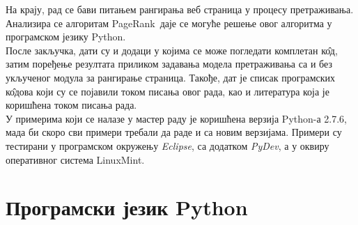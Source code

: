 \documentclass[11pt, serbianc, english, titlepage]{article}
\begin{document}
         На крају, рад се бави питањем рангирања веб страница у процесу претраживања. Анализира се алгоритам PageRank\texttrademark\ даје се могуће решење овог алгоритма у програмском језику Python.\\
         После закључка, дати су и додаци у којима се може погледати комплетан к\^{о}д, затим поређење резултата приликом задавања модела претраживања са и без укљученог модула за рангирање страница. Такође, дат је списак програмских к\^{о}дова који су се појавили током писања овог рада, као и литература која је коришћена током писања рада.\\
         У примерима који се налазе у мастер раду је коришћена верзија Python-а 2.7.6, мада би скоро сви примери требали да раде и са новим верзијама. Примери су тестирани у програмском окружењу \emph{Eclipse}, са додатком \emph{PyDev}, а у оквиру оперативног система LinuxMint.  
          
\pagebreak
\section{Програмски језик Python}
\end{document}
